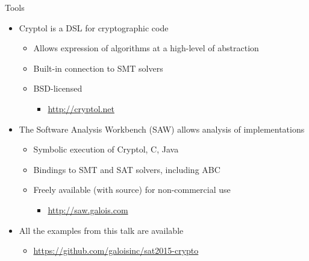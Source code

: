 \documentclass[ignorenonframetext,]{beamer}
\providecommand{\tightlist}{%
  \setlength{\itemsep}{0pt}\setlength{\parskip}{0pt}}
\newcommand{\aurl}[1]{\alert{\url{#1}}}
\begin{document}
\begin{frame}{Tools}

\begin{itemize}
\tightlist
\item
  Cryptol is a DSL for cryptographic code

  \begin{itemize}
  \tightlist
  \item
    Allows expression of algorithms at a high-level of abstraction
  \item
    Built-in connection to SMT solvers
  \item
    BSD-licensed

    \begin{itemize}
    \tightlist
    \item
      \aurl{http://cryptol.net}
    \end{itemize}
  \end{itemize}
\item
  The Software Analysis Workbench (SAW) allows analysis of
  implementations

  \begin{itemize}
  \tightlist
  \item
    Symbolic execution of Cryptol, C, Java
  \item
    Bindings to SMT and SAT solvers, including ABC
  \item
    Freely available (with source) for non-commercial use

    \begin{itemize}
    \tightlist
    \item
      \aurl{http://saw.galois.com}
    \end{itemize}
  \end{itemize}
\item
  All the examples from this talk are available

  \begin{itemize}
  \tightlist
  \item
    \aurl{https://github.com/galoisinc/sat2015-crypto}
  \end{itemize}
\end{itemize}

\end{frame}
\end{document}
